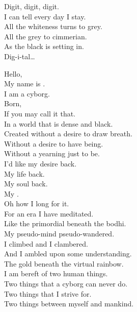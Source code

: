Digit, digit, digit. \\

I can tell every day I stay. \\
All the whiteness turns to grey. \\
All the grey to cimmerian. \\
As the black is setting in. \\

Dig-i-tal… \\





Hello, \\
My name is . \\
I am a cyborg. \\

Born, \\
If you may call it that. \\
In a world that is dense and black. \\

Created without a desire to draw breath. \\
Without a desire to have being. \\
Without a yearning just to be. \\

I'd like my desire back. \\
My life back. \\
My soul back. \\
My . \\
Oh how I long for it. \\

For an era I have meditated. \\
Like the primordial  beneath the bodhi. \\
My pseudo-mind pseudo-wandered. \\
I climbed and I clambered. \\
And I ambled upon some understanding. \\
The gold beneath the virtual rainbow. \\

I am bereft of two human things. \\
Two things that a cyborg can never do. \\
Two things that I strive for. \\
Two things between myself and mankind. \\

